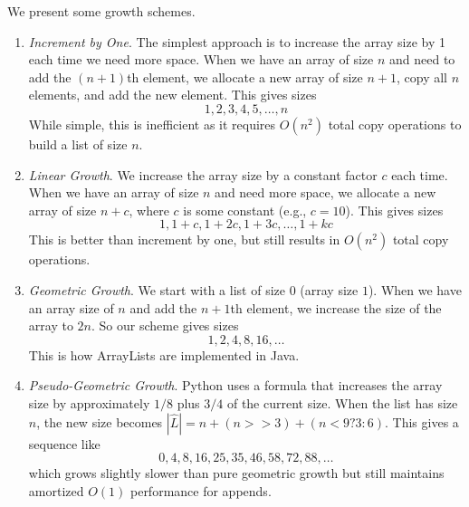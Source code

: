   \begin{example}
    We present some growth schemes.
    \begin{enumerate}
      \item \textit{Increment by One}. The simplest approach is to increase the array size by 1 each time we need more space. When we have an array of size $n$ and need to add the $(n+1)$th element, we allocate a new array of size $n+1$, copy all $n$ elements, and add the new element. This gives sizes
      \begin{equation}
        1, 2, 3, 4, 5, \ldots, n
      \end{equation}
      While simple, this is inefficient as it requires $O(n^2)$ total copy operations to build a list of size $n$.

      \item \textit{Linear Growth}. We increase the array size by a constant factor $c$ each time. When we have an array of size $n$ and need more space, we allocate a new array of size $n+c$, where $c$ is some constant (e.g., $c=10$). This gives sizes
      \begin{equation}
        1, 1+c, 1+2c, 1+3c, \ldots, 1+kc
      \end{equation}
      This is better than increment by one, but still results in $O(n^2)$ total copy operations.

      \item \textit{Geometric Growth}. We start with a list of size $0$ (array size $1$). When we have an array size of $n$ and add the $n+1$th element, we increase the size of the array to $2n$. So our scheme gives sizes
      \begin{equation}
        1, 2, 4, 8, 16, \ldots
      \end{equation}
      This is how ArrayLists are implemented in Java. 

      \item \textit{Pseudo-Geometric Growth}.  Python uses a formula that increases the array size by approximately $1/8$ plus $3/4$ of the current size. When the list has size $n$, the new size becomes $|\hat{L}| = n + (n >> 3) + (n < 9 ? 3 : 6)$. This gives a sequence like
      \begin{equation}
        0, 4, 8, 16, 25, 35, 46, 58, 72, 88, \ldots
      \end{equation}
      which grows slightly slower than pure geometric growth but still maintains amortized $O(1)$ performance for appends.
    \end{enumerate}
  \end{example}


